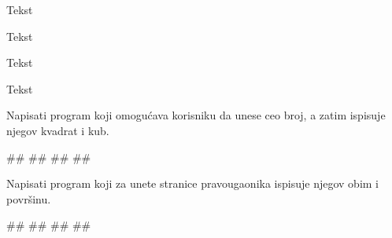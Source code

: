 \begin{Exercise}[label=v1.1_07] 
Tekst
\end{Exercise}
\begin{Answer}[ref=v1.1_07]
\end{Answer}

\begin{Exercise}[label=v1.1_08] 
Tekst
\end{Exercise}
\begin{Answer}[ref=v1.1_08]
\end{Answer}

\begin{Exercise}[label=v1.1_09] 
Tekst
\end{Exercise}
\begin{Answer}[ref=v1.1_09]
\end{Answer}

\begin{Exercise}[label=v1.1_10] 
Tekst
\end{Exercise}
\begin{Answer}[ref=v1.1_10]
\end{Answer}




\begin{Exercise}[label=p1_01] 
Napisati program koji omogućava korisniku da unese ceo broj, a zatim ispisuje njegov kvadrat i kub. \\
\begin{miditest}
\begin{upotreba}{1}
#\naslovInt#
##
##
##
\end{upotreba}
\end{miditest}
\end{Exercise}
\begin{Answer}[ref=p1_01]
\end{Answer}

\begin{Exercise}[label=p1_02] 
Napisati program koji za unete stranice pravougaonika ispisuje njegov obim i površinu.\\
\begin{miditest}
\begin{upotreba}{1}
#\naslovInt#
##
##
##
\end{upotreba}
\end{miditest}
\end{Exercise}
\begin{Answer}[ref=p1_02]
\end{Answer}



